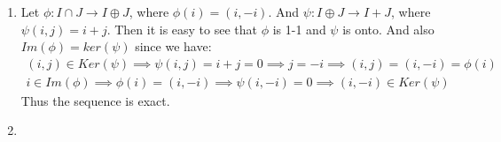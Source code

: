 \begin{enumerate}[label=\ilabel]
    \item 
        Let $\phi: I \cap J \to I \oplus J$, where $\phi(i) = (i, -i)$. And $\psi: I \oplus J \to I + J$, where $\psi(i, j) = i + j$. Then it is easy to see that $\phi$ is 1-1 and $\psi$ is onto. And also $Im(\phi) = ker(\psi)$ since we have:
        \begin{gather*}
            (i, j) \in Ker(\psi) \implies \psi(i, j) = i + j = 0 \implies j = -i \implies (i, j) = (i, -i) = \phi(i) \\
            i \in Im(\phi) \implies \phi(i) = (i, -i) \implies \psi(i, -i) = 0 \implies (i, -i) \in Ker(\psi)
        \end{gather*}
        Thus the sequence is exact.

    \item
        
\end{enumerate}